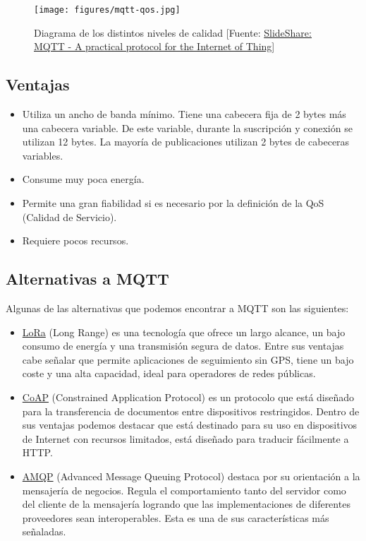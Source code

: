 \begin{figure}[htb]
	\begin{center}
		\texttt{[image: figures/mqtt-qos.jpg]}
		\caption{Diagrama de los distintos niveles de calidad [Fuente: \href{https://image.slidesharecdn.com/0xwitjksqnqruoz4tnsi-signature-6a256d24caf5d1fcc6a3bf1d013dfe0e1fa99369a560d140998f50cbdbc6d127-poli-140828123252-phpapp02/95/mqtt-a-practical-protocol-for-the-internet-of-things-15-638.jpg?cb=1409229409}{SlideShare: MQTT - A practical protocol for the Internet of Thing}] \label{qos}}
	\end{center}
\end{figure}

\subsection{Ventajas}
\begin{itemize}  
\item Utiliza un ancho de banda mínimo. Tiene una cabecera fija de 2 bytes más una cabecera variable. De este variable, durante la suscripción y conexión se utilizan 12 bytes. La mayoría de publicaciones utilizan 2 bytes de cabeceras variables.
\item Consume muy poca energía.
\item Permite una gran fiabilidad si es necesario por la definición de la QoS (Calidad de Servicio).
\item Requiere pocos recursos.
\end{itemize}

\subsection{Alternativas a MQTT}
Algunas de las alternativas que podemos encontrar a MQTT son las siguientes:

\begin{itemize}  
\item \href{https://www.lora-alliance.org/What-Is-LoRa/Technology}{LoRa} (Long Range) es una tecnología que ofrece un largo alcance, un bajo consumo de energía y una transmisión segura de datos. Entre sus ventajas cabe señalar que permite aplicaciones de seguimiento sin GPS, tiene un bajo coste y una alta capacidad, ideal para operadores de redes públicas.
\item \href{https://en.wikipedia.org/wiki/Constrained_Application_Protocol}{CoAP} (Constrained Application Protocol) es un protocolo que está diseñado para la transferencia de documentos entre dispositivos restringidos. Dentro de sus ventajas podemos destacar que está destinado para su uso en dispositivos de Internet con recursos limitados, está diseñado para traducir fácilmente a HTTP.
\item \href{https://www.amqp.org/}{AMQP} (Advanced Message Queuing Protocol) destaca por su orientación a la mensajería de negocios. Regula el comportamiento tanto del servidor como del cliente de la mensajería logrando que las implementaciones de diferentes proveedores sean interoperables. Esta es una de sus características más señaladas.
\end{itemize}
